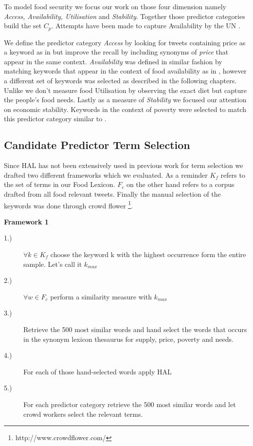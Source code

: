 To model food security we focus our work on those four dimension namely \emph{Access, Availability, Utilisation} and \emph{Stability}. Together those predictor categories build the set $C_p$. Attempts have been made to capture Availability by the UN \cite{ungp2013}. 

We define the predictor category \emph{Access} by looking for tweets containing price as a keyword as in \cite{ungp2013} but improve the recall by including synonyms of \emph{price} that appear in the same context. \emph{Availability} was defined in similar fashion by matching keywords that appear in the context of food availability as in \cite{hum14}, however a different set of keywords was selected as described in the following chapters. Unlike \cite{AbbarMW14} we don't measure food Utilisation by observing the exact diet but capture the people's food needs. Lastly as a measure of \emph{Stability} we focused our attention on economic stability. Keywords in the context of  poverty were selected to match this predictor category similar to \cite{RePEc} \cite{hum14}.



\subsection{Candidate Predictor Term Selection}

Since HAL has not been extensively used in previous work for term selection we drafted two different frameworks which we evaluated. As a reminder $K_f$ refers to the set of terms in our Food Lexicon. $F_c$ on the other hand refers to a corpus drafted from all food relevant tweets. Finally the manual selection of the keywords was done through crowd flower \footnote{http://www.crowdflower.com/}. 


\textbf{Framework 1}

\begin{description}
  \item[1.)] $\forall k \in K_f$ choose the keyword k with the highest occurrence form the entire sample. Let's call it $k_{max}$  
  \item[2.)] $\forall w \in F_c $ perform a similarity measure with $k_{max}$
  \item[3.)] Retrieve the 500 most similar words and hand select the words that occurs in the synonym lexicon thesaurus for supply, price, poverty and needs. 
    \item[4.)] For each of those hand-selected words  apply HAL 
  \item[5.)] For each predictor category retrieve the 500 most similar words and let crowd workers select the relevant terms. 
    \end{description}

